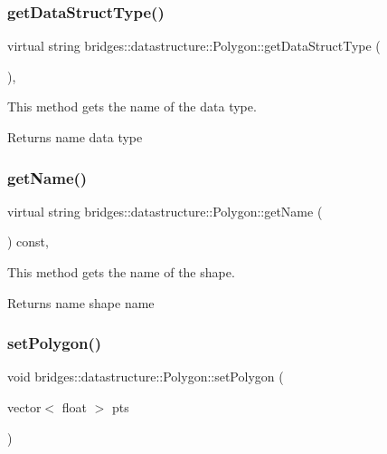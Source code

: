 \subsubsection{\texorpdfstring{get\+Data\+Struct\+Type()}{getDataStructType()}}
{\footnotesize\ttfamily virtual string bridges\+::datastructure\+::\+Polygon\+::get\+Data\+Struct\+Type (\begin{DoxyParamCaption}{ }\end{DoxyParamCaption})\hspace{0.3cm}{\ttfamily [inline]}, {\ttfamily [virtual]}}



This method gets the name of the data type. 

\begin{DoxyReturn}{Returns}
name data type 
\end{DoxyReturn}
\mbox{\label{classbridges_1_1datastructure_1_1_polygon_a9e11131b2a1f3b6044913577f51546c3}} 
\subsubsection{\texorpdfstring{get\+Name()}{getName()}}
{\footnotesize\ttfamily virtual string bridges\+::datastructure\+::\+Polygon\+::get\+Name (\begin{DoxyParamCaption}{ }\end{DoxyParamCaption}) const\hspace{0.3cm}{\ttfamily [inline]}, {\ttfamily [virtual]}}



This method gets the name of the shape. 

\begin{DoxyReturn}{Returns}
name shape name 
\end{DoxyReturn}
\mbox{\label{classbridges_1_1datastructure_1_1_polygon_a058a8ec2340f15f45dab27b18978055c}} 
\subsubsection{\texorpdfstring{set\+Polygon()}{setPolygon()}}
{\footnotesize\ttfamily void bridges\+::datastructure\+::\+Polygon\+::set\+Polygon (\begin{DoxyParamCaption}\item[{vector$<$ float $>$}]{pts }\end{DoxyParamCaption})\hspace{0.3cm}{\ttfamily [inline]}}



